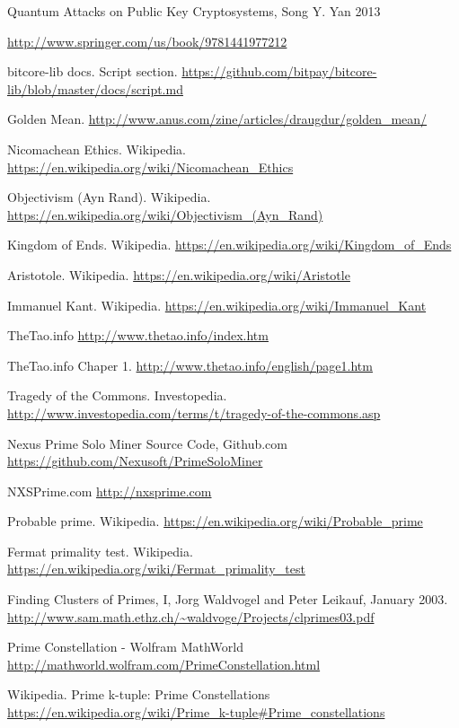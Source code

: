 \documentclass[11pt]{article}
\begin{document}
\begin{thebibliography}{7}
Quantum Attacks on Public Key Cryptosystems, Song Y. Yan 2013

\url{http://www.springer.com/us/book/9781441977212}

bitcore-lib docs. Script section.
\url{https://github.com/bitpay/bitcore-lib/blob/master/docs/script.md}

Golden Mean.
\url{http://www.anus.com/zine/articles/draugdur/golden_mean/}

Nicomachean Ethics. Wikipedia.
\url{https://en.wikipedia.org/wiki/Nicomachean_Ethics}

Objectivism (Ayn Rand). Wikipedia.
\url{https://en.wikipedia.org/wiki/Objectivism_(Ayn_Rand)}

Kingdom of Ends. Wikipedia.
\url{https://en.wikipedia.org/wiki/Kingdom_of_Ends}

Aristotole. Wikipedia.
\url{https://en.wikipedia.org/wiki/Aristotle}

Immanuel Kant. Wikipedia.
\url{https://en.wikipedia.org/wiki/Immanuel_Kant}

TheTao.info
\url{http://www.thetao.info/index.htm}

TheTao.info Chaper 1.
\url{http://www.thetao.info/english/page1.htm}

Tragedy of the Commons. Investopedia.
\url{http://www.investopedia.com/terms/t/tragedy-of-the-commons.asp}

Nexus Prime Solo Miner Source Code, Github.com
\url{https://github.com/Nexusoft/PrimeSoloMiner}

NXSPrime.com
\url{http://nxsprime.com}

Probable prime. Wikipedia.
\url{https://en.wikipedia.org/wiki/Probable_prime}

Fermat primality test. Wikipedia.
\url{https://en.wikipedia.org/wiki/Fermat_primality_test}

Finding Clusters of Primes, I, Jorg Waldvogel and Peter Leikauf, January 2003.
\url{http://www.sam.math.ethz.ch/~waldvoge/Projects/clprimes03.pdf}

Prime Constellation - Wolfram MathWorld
\url{http://mathworld.wolfram.com/PrimeConstellation.html}

Wikipedia. Prime k-tuple: Prime Constellations
\url{https://en.wikipedia.org/wiki/Prime_k-tuple#Prime_constellations}


\end{thebibliography}
\end{document}
